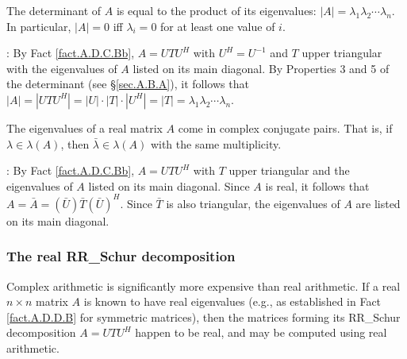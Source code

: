 \begin{fact} \label{fact.A.D.C.Be} The determinant of $A$ is equal to the product of its eigenvalues:
$|A|=\lambda_{1}\lambda_{2}\cdots\lambda_{n}$.  In particular, $|A|=0$
iff $\lambda_{i}=0$ for at least one value of $i$.
\end{fact}

\/: By Fact \ref{fact.A.D.C.Bb}, $A=UTU^{H}$ with
$U^{H}=U^{-1}$ and $T$ upper triangular with the eigenvalues of $A$
listed on its main diagonal.  By Properties 3 and 5 of the determinant
(see \S \ref{sec.A.B.A}), it follows that $|A|=|UTU^{H}|=|U|\cdot
|T|\cdot |U^{H}|= |T| =
\lambda_{1}\lambda_{2}\cdots\lambda_{n}$.  \endproof \vskip0.1in

\begin{fact} \label{fact.A.D.C.Bf} The eigenvalues of a real matrix $A$ come in complex conjugate pairs.
That is, if $\lambda\in \lambda(A)$, then $\bar\lambda \in \lambda(A)$ with the same multiplicity.
\end{fact}

\/: By Fact \ref{fact.A.D.C.Bb}, $A=UTU^{H}$ with $T$ upper triangular and the eigenvalues of $A$
listed on its main diagonal.  Since $A$ is real, it follows that $A=\bar A=(\bar U) \bar T (\bar U)^{H}$.  Since $\bar T$ is also triangular,
the eigenvalues of $A$ are listed on its main diagonal.  \endproof

\subsubsection{The real RR_Schur decomposition} \label{sec.A.D.Ca}

Complex arithmetic is significantly more expensive than real arithmetic.  If a real $n\times n$ matrix $A$ is known
to have real eigenvalues (e.g., as established in Fact \ref{fact.A.D.D.B} for symmetric matrices), then the matrices forming its
RR_Schur decomposition $A=UTU^H$ happen to be real, and may be computed using real arithmetic.  

